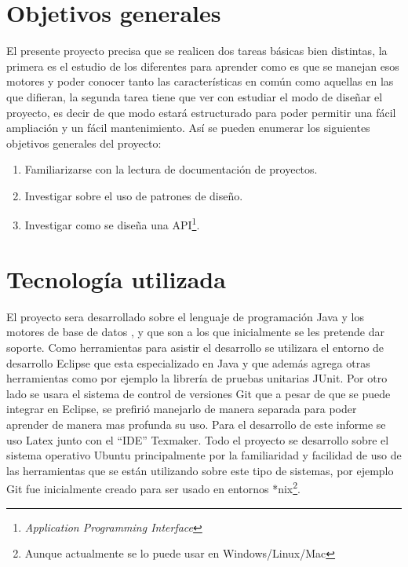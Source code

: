 \section{Objetivos generales}
El presente proyecto precisa que se realicen dos tareas básicas bien distintas, la primera es el estudio de los diferentes \dd para aprender como es que se manejan esos motores y poder conocer tanto las características en común como aquellas en las que difieran, la segunda tarea tiene que ver con estudiar el modo de diseñar el proyecto, es decir de que modo estará estructurado \jj para poder permitir una fácil ampliación y un fácil mantenimiento. Así se pueden enumerar los siguientes objetivos generales del proyecto:
\begin{enumerate}
\item Familiarizarse con la lectura de documentación de proyectos.
\item Investigar sobre el uso de patrones de diseño.
\item Investigar como se diseña una API\footnote{\textit{Application Programming Interface}}.
\end{enumerate}
%
\section{Tecnología utilizada}
El proyecto sera desarrollado sobre el lenguaje de programación Java y los motores de base de datos \m, \p y \s que son a los que inicialmente se les pretende dar soporte. Como herramientas para asistir el desarrollo se utilizara el entorno de desarrollo Eclipse que esta especializado en Java y que además agrega otras herramientas como por ejemplo la librería de pruebas unitarias JUnit. Por otro lado se usara el sistema de control de versiones Git que a pesar de que se puede integrar en Eclipse, se prefirió manejarlo de manera separada para poder aprender de manera mas profunda su uso. Para el desarrollo de este informe se uso Latex junto con el ``IDE'' Texmaker. Todo el proyecto se desarrollo sobre el sistema operativo Ubuntu principalmente por la familiaridad y facilidad de uso de las herramientas que se están utilizando sobre este tipo de sistemas, por ejemplo Git fue inicialmente creado para ser usado en entornos *nix\footnote{Aunque actualmente se lo puede usar en Windows/Linux/Mac}.
%
%
%
%
